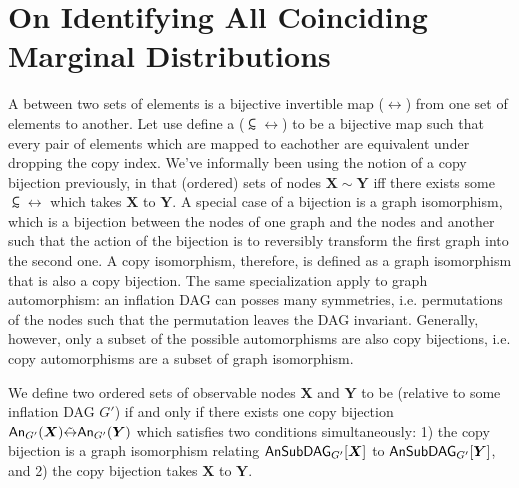 \section{On Identifying All Coinciding Marginal Distributions}\label{sec:coincidingdetails}


A  between two sets of elements is a bijective invertible map ($\leftrightarrow$) from one set of elements to another. Let use define a  ($\subsim{\leftrightarrow}$) to be a bijective map such that every pair of elements which are mapped to eachother are equivalent under dropping the copy index. We've informally been using the notion of a copy bijection previously, in that (ordered) sets of nodes $\bm{X}\sim\bm{Y}$ iff there exists some $\subsim{\leftrightarrow}$ which takes $\bm{X}$ to $\bm{Y}$.
A special case of a bijection is a graph isomorphism, which is a bijection between the nodes of one graph and the nodes and another such that the action of the bijection is to reversibly transform the first graph into the second one. A copy isomorphism, therefore, is defined as a graph isomorphism that is also a copy bijection. The same specialization apply to graph automorphism: an inflation DAG can posses many symmetries, i.e. permutations of the nodes such that the permutation leaves the DAG invariant. Generally, however, only a subset of the possible automorphisms are also copy bijections, i.e. copy automorphisms are a subset of graph isomorphism.

We define two ordered sets of observable nodes $\bm{X}$ and $\bm{Y}$ to be  (relative to some inflation DAG $G'$) if and only if there exists one copy bijection $\An[G']{\bm{X}}\subsim{\leftrightarrow}\An[G']{\bm{Y}}$ which satisfies two conditions simultaneously: 1) the copy bijection is a graph isomorphism relating $\ansubgraph[G']{\bm{X}}$ to $\ansubgraph[G']{\bm{Y}}$, and 2) the copy bijection takes $\bm{X}$ to $\bm{Y}$. 

